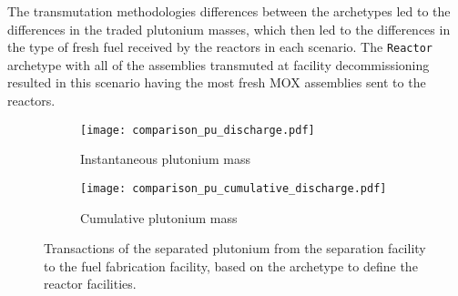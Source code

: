 The transmutation methodologies differences between the archetypes 
led to the differences in the traded plutonium masses, which then 
led to the differences in the type of fresh fuel received by 
the reactors in each scenario. The \Cycamore \texttt{Reactor}
archetype with all of the assemblies transmuted at facility 
decommissioning resulted in this scenario having the most 
fresh \gls{MOX} assemblies sent to the reactors. 

\begin{figure}[ht!]
    \centering
    \begin{subfigure}[b]{0.48\textwidth}
        \centering
        \texttt{[image: comparison\_pu\_discharge.pdf]}
        \caption{Instantaneous plutonium mass}
        \label{fig:comparison_pu_inst_discharge}
    \end{subfigure}
    \hfill
    \begin{subfigure}[b]{0.48\textwidth}
        \centering
        \texttt{[image: comparison\_pu\_cumulative\_discharge.pdf]}
        \caption{Cumulative plutonium mass}
        \label{fig:comparison_pu_cumulative_discharge}
    \end{subfigure}
       \caption{Transactions of the separated plutonium from the
       separation facility to the fuel fabrication facility, based 
       on the archetype to define the reactor facilities.}
       \label{fig:comparison_pu_discharge}
\end{figure}
